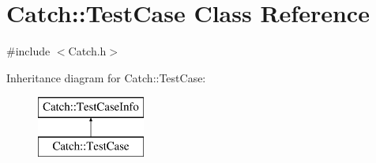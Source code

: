 \hypertarget{class_catch_1_1_test_case}{}\section{Catch\+:\+:Test\+Case Class Reference}
\label{class_catch_1_1_test_case}


{\ttfamily \#include $<$Catch.\+h$>$}

Inheritance diagram for Catch\+:\+:Test\+Case\+:\begin{figure}[H]
\begin{center}
\leavevmode
\includegraphics[height=2.000000cm]{class_catch_1_1_test_case}
\end{center}
\end{figure}
